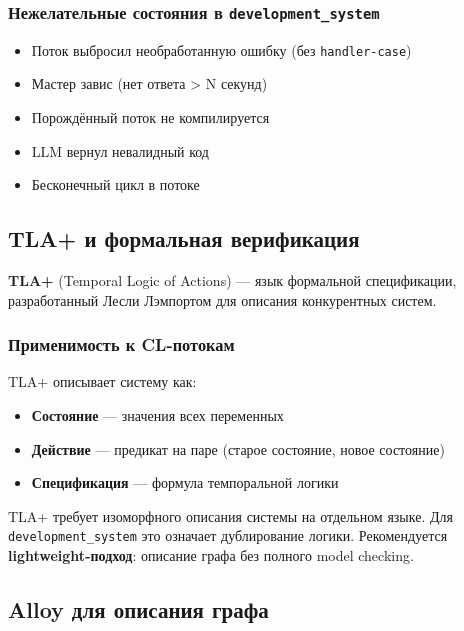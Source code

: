\documentclass[12pt, a4paper, twoside]{article}
\begin{document}
\subsubsection{Нежелательные состояния в \texttt{development\_system}}

\begin{itemize}[leftmargin=1.5em]
  \item Поток выбросил необработанную ошибку (без \texttt{handler-case})
  \item Мастер завис (нет ответа > N секунд)
  \item Порождённый поток не компилируется
  \item LLM вернул невалидный код
  \item Бесконечный цикл в потоке
\end{itemize}

\subsection{TLA+ и формальная верификация}

\textbf{TLA+} (Temporal Logic of Actions) --- язык формальной спецификации,
разработанный Лесли Лэмпортом для описания конкурентных систем.

\subsubsection{Применимость к CL-потокам}

TLA+ описывает систему как:
\begin{itemize}[leftmargin=1.5em]
  \item \textbf{Состояние} --- значения всех переменных
  \item \textbf{Действие} --- предикат на паре (старое состояние, новое состояние)
  \item \textbf{Спецификация} --- формула темпоральной логики
\end{itemize}

\begin{warningbox}[title={Ограничения TLA+}]
TLA+ требует изоморфного описания системы на отдельном языке.
Для \texttt{development\_system} это означает дублирование логики.
Рекомендуется \textbf{lightweight-подход}: описание графа без
полного model checking.
\end{warningbox}

\subsection{Alloy для описания графа}
\end{document}
